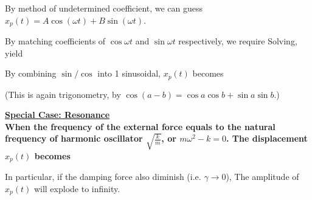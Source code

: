 \documentclass[class=article, crop=false, 12pt]{standalone}
\begin{document}
By method of undetermined coefficient, 
we can guess $x_p(t) = A\cos{(\omega t)} + B\sin{(\omega t)}$.

By matching coefficients of $\cos{\omega t}$ and $\sin{\omega t}$ respectively, we require
Solving, yield

By combining $\sin/\cos$ into 1 sinusoidal, $x_p(t)$ becomes

(This is again trigonometry, by $\cos(a-b)=\cos{a}\cos{b}+\sin{a}\sin{b}$.)

\newpage
\bf{\ul{Special Case: Resonance}}\\

When the frequency of the external force equals to the natural frequency of harmonic oscillator $\sqrt{\frac{k}{m}}$, 
or $m\omega^2 -k = 0$. 
The displacement $x_p(t)$ becomes

In particular, if the damping force also diminish (i.e. $\gamma \to 0$), 
The amplitude of $x_p(t)$ will explode to infinity. 

\theend
\end{document}
